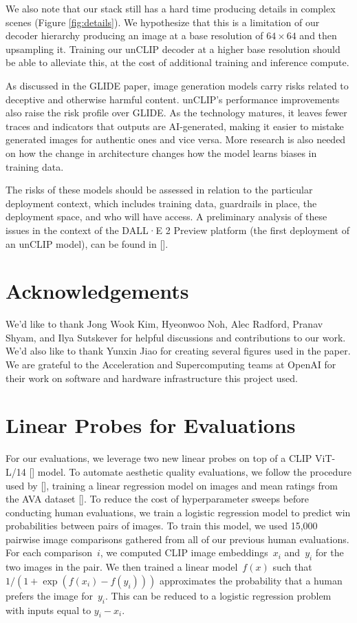 \documentclass{article}
\newcommand{\shortcite}[1]{[\citenum{#1}]}
\newcommand{\namecite}[1]{\citeauthor{#1} [\citenum{#1}]}
\newcommand{\modelname}{unCLIP}
\begin{document}
We also note that our stack still has a hard time producing details in complex scenes (Figure \ref{fig:details}). We hypothesize that this is a limitation of our decoder hierarchy producing an image at a base resolution of $64 \times 64$ and then upsampling it. Training our \modelname{} decoder at a higher base resolution should be able to alleviate this, at the cost of additional training and inference compute. 

As discussed in the GLIDE paper, image generation models carry risks related to deceptive and otherwise harmful content. \modelname{}'s performance improvements also raise the risk profile over GLIDE. As the technology matures, it leaves fewer traces and indicators that outputs are AI-generated, making it easier to mistake generated images for authentic ones and vice versa. More research is also needed on how the change in architecture changes how the model learns biases in training data.

The risks of these models should be assessed in relation to the particular deployment context, which includes training data, guardrails in place, the deployment space, and who will have access. A preliminary analysis of these issues in the context of the DALL·E 2 Preview platform (the first deployment of an unCLIP model), can be found in \namecite{mishkin2022risks}.

\section{Acknowledgements}
We’d like to thank Jong Wook Kim,  Hyeonwoo Noh, Alec Radford, Pranav Shyam, and Ilya Sutskever for helpful discussions and contributions to our work. We'd also like to thank Yunxin Jiao for creating several figures used in the paper. We are grateful to the Acceleration and Supercomputing teams at OpenAI for their work on software and hardware infrastructure this project used. 




\clearpage
\appendix
\section{Linear Probes for Evaluations}
\label{app:linear_probes}

For our evaluations, we leverage two new linear probes on top of a CLIP ViT-L/14 \shortcite{vit} model. To automate aesthetic quality evaluations, we follow the procedure used by \namecite{avaprobe}, training a linear regression model on images and mean ratings from the AVA dataset \shortcite{avadataset}. To reduce the cost of hyperparameter sweeps before conducting human evaluations, we train a logistic regression model to predict win probabilities between pairs of images. To train this model, we used 15,000 pairwise image comparisons gathered from all of our previous human evaluations. For each comparison~$i$, we computed CLIP image embeddings~$x_i$ and~$y_i$ for the two images in the pair. We then trained a linear model~$f(x)$ such that $1 / (1+\exp{(f(x_i) - f(y_i))})$ approximates the probability that a human prefers the image for~$y_i$. This can be reduced to a logistic regression problem with inputs equal to $y_i - x_i$.
\end{document}
